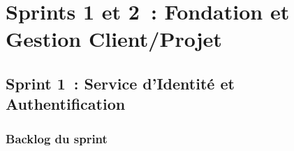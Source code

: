 \chapter{Sprints 1 et 2~: Fondation et Gestion Client/Projet}

\section{Sprint 1~: Service d'Identité et Authentification}

\subsection{Backlog du sprint}

